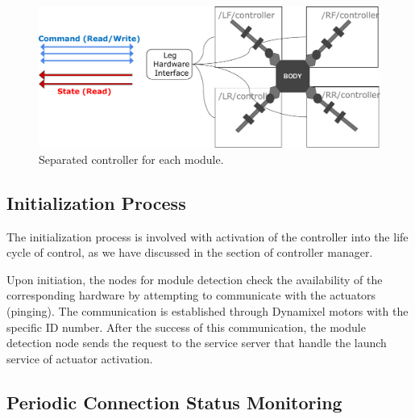 \begin{figure}[h]
  \centering
  \includegraphics[width=140mm]{./fig/chap3/control_system/mb_control2.pdf}
  \vspace{2mm}
  \caption{Separated controller for each module.}\label{mb_control}
\end{figure}



\subsection{Initialization Process}
The initialization process is involved with activation of the controller into the life cycle of control, as we have discussed in the section of controller manager.

Upon initiation, the nodes for module detection check the availability of the corresponding hardware by attempting to communicate with the actuators (pinging). The communication is established through Dynamixel motors with the specific ID number. After the success of this communication, the module detection node sends the request to the service server that handle the launch service of actuator activation.  


\subsection{Periodic Connection Status Monitoring}

